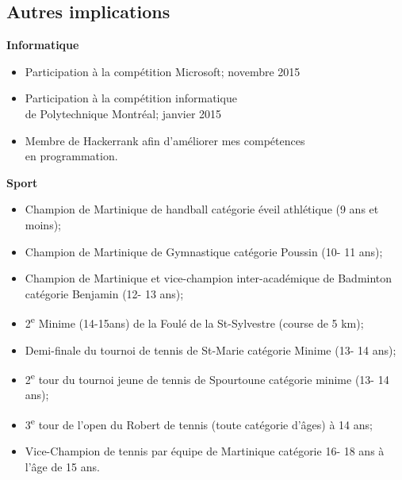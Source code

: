 \documentclass[margin]{res}
\begin{document}
\begin{resume}

  \section{Autres implications}

  {\bf Informatique}
  \begin{itemize} \itemsep -2pt %
  \item Participation \`a la comp\'etition Microsoft; \hfill novembre 2015
  \item Participation \`a la comp\'etition informatique\\ de Polytechnique Montr\'eal; \hfill janvier 2015
  \item Membre de Hackerrank afin d'am\'eliorer mes comp\'etences\\ en programmation.
  \end{itemize}
  
  {\bf Sport}
  \begin{itemize} \itemsep -2pt %
  \item Champion de Martinique de handball cat\'egorie \'eveil athl\'etique (9 ans et moins);
  \item Champion de Martinique de Gymnastique cat\'egorie Poussin (10- 11 ans);
  \item Champion de Martinique et vice-champion inter-acad\'emique de Badminton cat\'egorie Benjamin (12- 13 ans);
  \item 2\textsuperscript{e} Minime (14-15ans) de la Foul\'e de la St-Sylvestre (course de 5 km);
  \item Demi-finale du tournoi de tennis de St-Marie cat\'egorie Minime (13- 14 ans);
  \item 2\textsuperscript{e} tour du tournoi jeune de tennis de Spourtoune cat\'egorie minime (13- 14 ans);
  \item 3\textsuperscript{e} tour de l’open du Robert de tennis (toute cat\'egorie d'\^ages) à 14 ans;
  \item Vice-Champion de tennis par \'equipe de Martinique cat\'egorie 16- 18 ans \`a l'\^age de 15 ans.
  \end{itemize}


\end{resume} 
\end{document}
